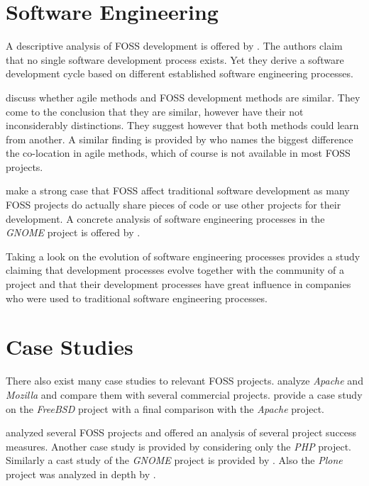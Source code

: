 
\section{Software Engineering} %

A descriptive analysis of \ac{FOSS} development is offered by
\textcite{Roets2007}. The authors claim that no single software development
process exists. Yet they derive a software development cycle based on different
established software engineering processes.

\textcite{Warsta2003} discuss whether agile methods and \ac{FOSS} development
methods are similar. They come to the conclusion that they are similar, however
have their not inconsiderably distinctions. They suggest however that both
methods could learn from another. A similar finding is provided by
\textcite{Koch2004} who names the biggest difference the co-location in agile
methods, which of course is not available in most \ac{FOSS} projects.

\textcite{Spinellis2004} make a strong case that \ac{FOSS} affect traditional
software development as many \ac{FOSS} projects do actually share pieces of
code or use other projects for their development. A concrete analysis of
software engineering processes in the \emph{GNOME} project is offered by
\textcite{German2003}.

Taking a look on the evolution of software engineering processes
\textcite{Scacchi2006} provides a study claiming that development processes
evolve together with the community of a project and that their development
processes have great influence in companies who were used to traditional
software engineering processes.


\section{Case Studies} %

There also exist many case studies to relevant \ac{FOSS} projects.
\textcite{Mockus2002} analyze \emph{Apache} and \emph{Mozilla} and compare them
with several commercial projects. \textcite{Dinh-Trong2004} provide a case
study on the \emph{FreeBSD} project with a final comparison with the
\emph{Apache} project.

\textcite{crowston2004} analyzed several \ac{FOSS} projects and offered an
analysis of several project success measures. Another case study is provided by
\textcite{Magnusson2010} considering only the \emph{PHP} project. Similarly a
cast study of the \emph{GNOME} project is provided by \textcite{Koch2002}. Also
the \emph{Plone} project was analyzed in depth by \textcite{Aspeli2005}.

